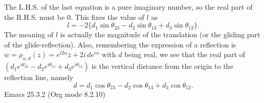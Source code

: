\documentclass{article}
\begin{document}
The L.H.S. of the last equation is a pure imaginary number, so the real part of the R.H.S. must be \(0\). 
This fixes the value of \(l\) as
\begin{equation}
l = - 2 \{ d_{1} \sin{\theta_{23}} - d_{2} \sin{\theta_{13}} + d_{3} \sin{\theta_{12}}\}.
\end{equation}
The meaning of \(l\) is actually the magnitude of the translation (or the gliding part of the glide-reflection).
Also, remembering the expression of a reflection is \(w = \rho_{\alpha,d} (z) = e^{i2\alpha} \bar{z} + 2i \, de^{i\alpha}\) with \(d\) being real, 
we see that the real part of \(( d_{1} e^{i\theta_{23}} - d_{2} e^{i\theta_{13}} + d_{3} e^{i\theta_{12}})\) is the vertical distance from the origin to the reflection line, namely
\begin{equation}
d = d_{1} \cos{\theta_{23}} - d_{2} \cos{\theta_{13}} + d_{3} \cos{\theta_{12}}.
\end{equation}
Emacs 25.3.2 (Org mode 8.2.10)
\end{document}
